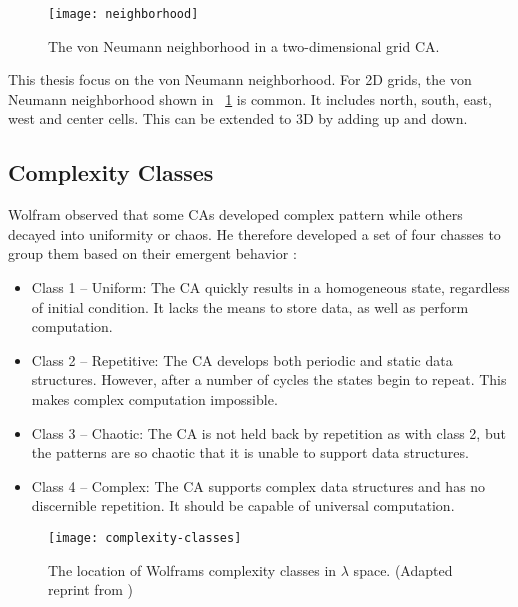 \begin{figure}[!ht]
    \centering
    \texttt{[image: neighborhood]}
    \caption[Neighborhood]{
        The von Neumann neighborhood in a two-dimensional grid CA.
    }
    \label{fig:neighborhood}
\end{figure}

This thesis focus on the von Neumann neighborhood.
For 2D grids, the von Neumann neighborhood shown in \figurename~\ref{fig:neighborhood} is common.
It includes north, south, east, west and center cells.
This can be extended to 3D by adding up and down.

\subsection{Complexity Classes}

Wolfram observed that some CAs developed complex pattern while others decayed into uniformity or chaos.
He therefore developed a set of four chasses to group them based on their emergent behavior \cite{wolfram1984complexity}:

\begin{itemize}
    \item Class 1 – Uniform:
        The CA quickly results in a homogeneous state, regardless of initial condition.
        It lacks the means to store data, as well as perform computation.
    \item Class 2 – Repetitive:
        The CA develops both periodic and static data structures.
        However, after a number of cycles the states begin to repeat.
        This makes complex computation impossible.
    \item Class 3 – Chaotic:
        The CA is not held back by repetition as with class 2, but the patterns are so chaotic that it is unable to support data structures.
    \item Class 4 – Complex:
        The CA supports complex data structures and has no discernible repetition.
        It should be capable of universal computation.
\end{itemize}

\begin{figure}[!ht]
    \centering
    \texttt{[image: complexity-classes]}
    \caption[Complexity classes]{
        The location of Wolframs complexity classes in $\lambda$ space.
        (Adapted reprint from \cite{langton1990edgeofchaos})
    }
    \label{fig:complexity-classes}
\end{figure}

